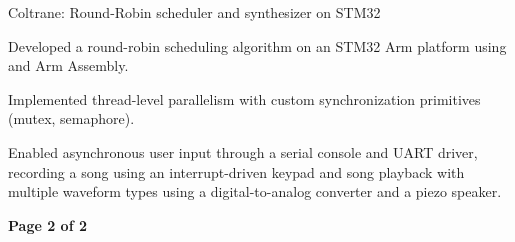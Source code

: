 \documentclass[11pt]{article}
\begin{document}
\sectionproj
{Coltrane: Round-Robin scheduler and synthesizer on STM32} 
{\begin{circlist}
  \item Developed a round-robin scheduling algorithm on an STM32 Arm platform using  and Arm Assembly.
  \item Implemented thread-level parallelism with custom synchronization primitives (mutex, semaphore).
  \item Enabled asynchronous user input through a serial console and UART driver, recording a song using an interrupt-driven keypad and song playback with multiple waveform types using a digital-to-analog converter and a piezo speaker. 
\end{circlist}}
\rootend


\begin{indentsection}
\end{indentsection}

\vfill
\hfill {\bfseries{Page 2 of 2}}
\end{document}
